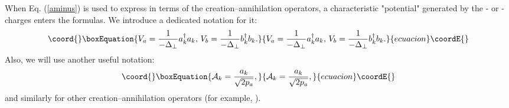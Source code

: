 \documentclass[a4paper,12pt]{article}
\begin{document}
When Eq. (\ref{aminus}) is used to express \coordHE{} in terms of the 
creation--annihilation operators, a characteristic 
"potential" generated by the \coordHE{}- or \coordHE{}-
charges enters the formulas. We introduce a dedicated notation for it:
\begin{equation}\coord{}\boxEquation{
\label{potential}
V_{a}=\frac{1}{-\Delta_\perp}a^\dagger_ka_k,\, 
V_{b}=\frac{1}{-\Delta_\perp}b^\dagger_kb_k.
}{
V_{a}=\frac{1}{-\Delta_\perp}a^\dagger_ka_k,\, 
V_{b}=\frac{1}{-\Delta_\perp}b^\dagger_kb_k.
}{ecuacion}\coordE{}\end{equation}
Also, we will use another useful notation:
\begin{equation}\coord{}\boxEquation{
\label{cal}
{\cal A}_k = \frac{a_k}{\sqrt{2p_a}},
}{
{\cal A}_k = \frac{a_k}{\sqrt{2p_a}},
}{ecuacion}\coordE{}\end{equation}
and similarly for other creation--annihilation operators (for example, 
\coordHE{}). 
\end{document}
